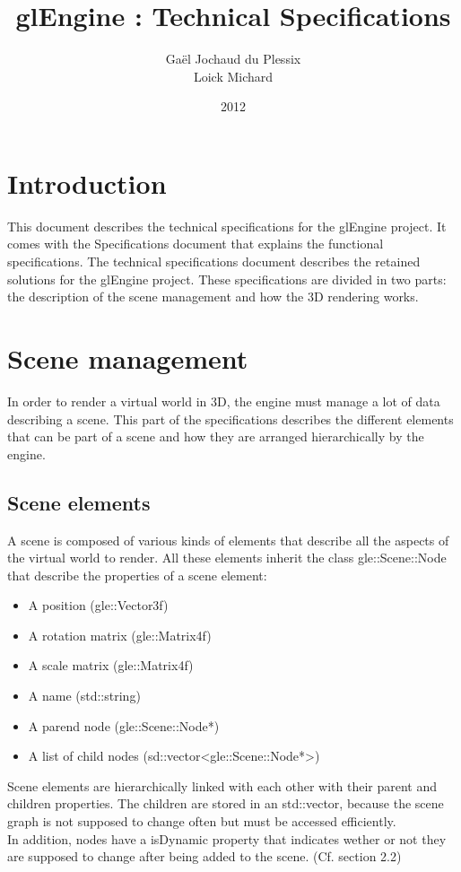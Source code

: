 \documentclass [a4 paper,11pt]{report}
\title {glEngine : Technical Specifications}
\author {Gaël Jochaud du Plessix\\
Loick Michard}
\date {2012}
\begin{document}
\maketitle

\newpage

\tableofcontents

\newpage

\chapter{Introduction}
This document describes the technical specifications for the glEngine project. It comes with the Specifications document that explains the functional specifications. The technical specifications document describes the retained solutions for the glEngine project. These specifications are divided in two parts: the description of the scene management and how the 3D rendering works.

\chapter{Scene management}
In order to render a virtual world in 3D, the engine must manage a lot of data describing a scene. This part of the specifications describes the different elements that can be part of a scene and how they are arranged hierarchically by the engine.

\section{Scene elements}
A scene is composed of various kinds of elements that describe all the aspects of the virtual world to render.
All these elements inherit the class gle::Scene::Node that describe the properties of a scene element:
\begin{itemize}
\item A position (gle::Vector3f)
\item A rotation matrix (gle::Matrix4f)
\item A scale matrix (gle::Matrix4f)
\item A name (std::string)
\item A parend node (gle::Scene::Node*)
\item A list of child nodes (sd::vector<gle::Scene::Node*>)
\end{itemize}
Scene elements are hierarchically linked with each other with their parent and children properties. The children are stored in an std::vector, because the scene graph is not supposed to change often but must be accessed efficiently.\\
In addition, nodes have a isDynamic property that indicates wether or not they are supposed to change after being added to the scene. (Cf. section 2.2)
\end{document}
